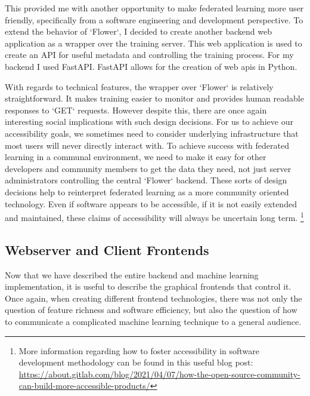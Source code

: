 \documentclass[manuscript,screen,review]{acmart}
\begin{document}
This provided me with another opportunity to make federated learning more user friendly, specifically from a software engineering and development perspective. To extend the behavior of `Flower`, I decided to create another backend web application as a wrapper over the training server. This web application is used to create an API for useful metadata and controlling the training process. For my backend I used FastAPI. FastAPI allows for the creation of web apis in Python.

With regards to technical features, the wrapper over `Flower` is relatively straightforward. It makes training easier to monitor and provides human readable responses to `GET` requests. However despite this, there are once again interesting social implications with such design decisions. For us to achieve our accessibility goals, we sometimes need to consider underlying infrastructure that most users will never directly interact with. To achieve success with federated learning in a communal environment, we need to make it easy for other developers and community members to get the data they need, not just server administrators controlling the central `Flower` backend. These sorts of design decisions help to reinterpret federated learning as a more community oriented technology. Even if software appears to be accessible, if it is not easily extended and maintained, these claims of accessibility will always be uncertain long term. \footnote{More information regarding how to foster accessibility in software development methodology can be found in this useful blog post: \url{https://about.gitlab.com/blog/2021/04/07/how-the-open-source-community-can-build-more-accessible-products/}}

\subsection*{Webserver and Client Frontends}

Now that we have described the entire backend and machine learning implementation, it is useful to describe the graphical frontends that control it. Once again, when creating different frontend technologies, there was not only the question of feature richness and software efficiency, but also the question of how to communicate a complicated machine learning technique to a general audience.
\end{document}
